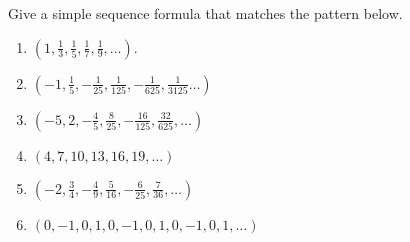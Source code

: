 Give a simple sequence formula that matches the pattern below. 

\begin{multicols}{2}
\begin{enumerate}
\item $\displaystyle \left(1, \frac{1}{3}, \frac{1}{5}, \frac{1}{7},\frac{1}{9},\dots \right)$.

\item $\displaystyle \left(-1, \frac{1}{5}, -\frac{1}{25}, \frac{1}{125},-\frac{1}{625}, \frac{1}{3125}\dots \right)$

\item $\displaystyle \left(-5, 2, -\frac{4}{5}, \frac{8}{25}, -\frac{16}{125}, \frac{32}{625},\dots \right)$


\item $\displaystyle \left(4, 7, 10, 13, 16, 19,\dots\right)$


\item $\left(-2, \frac{3}{4}, -\frac{4}{9}, \frac{5}{16}, -\frac{6}{25}, \frac{7}{36}, \dots \right)$


\item $\left(0,-1, 0, 1,0,-1, 0, 1,0,-1, 0, 1,\dots \right)$

\end{enumerate}
\end{multicols}